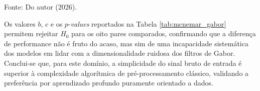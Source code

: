 \begin{table}[!h]
    \centering
    \begin{threeparttable}
    \caption{Teste de McNemar comparando RGB e Gabor sob Luz Branca.}
    \label{tab:mcnemar_gabor}
    
    \begin{tablenotes}
            \small 
            \item[] Fonte: Do autor (2026).
        \end{tablenotes}
        \end{threeparttable}
\end{table}

Os valores $b$, $c$ e os $p$-\textit{values} reportados na Tabela \ref{tab:mcnemar_gabor} permitem rejeitar $H_{0}$ para os oito pares comparados, confirmando que a diferença de performance não é fruto do acaso, mas sim de uma incapacidade sistemática dos modelos em lidar com a dimensionalidade ruidosa dos filtros de Gabor. Conclui-se que, para este domínio, a simplicidade do sinal bruto de entrada é superior à complexidade algorítmica de pré-processamento clássico, validando a preferência por aprendizado profundo puramente orientado a dados.

